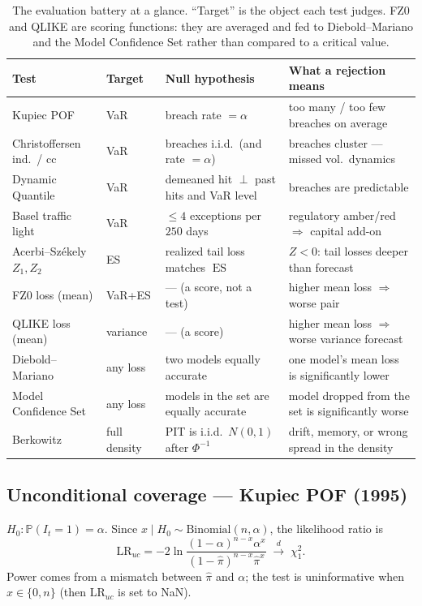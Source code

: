 \documentclass[11pt,a4paper]{article}
\newcommand{\Prob}{\mathbb{P}}
\newcommand{\ES}{\operatorname{ES}}
\newcommand{\dto}{\xrightarrow{d}}
\begin{document}
\begin{table}[h]
\centering\small
\begin{tabular}{@{}p{3.0cm}p{1.1cm}p{4.6cm}p{4.6cm}@{}}
\toprule
Test & Target & Null hypothesis & What a rejection means \\
\midrule
Kupiec POF        & VaR & breach rate $=\alpha$ & too many / too few breaches on average \\
Christoffersen ind.\ / cc & VaR & breaches i.i.d.\ (and rate $=\alpha$) & breaches cluster --- missed vol.\ dynamics \\
Dynamic Quantile  & VaR & demeaned hit $\perp$ past hits and VaR level & breaches are predictable \\
Basel traffic light & VaR & $\le4$ exceptions per $250$ days & regulatory amber/red $\Rightarrow$ capital add-on \\
Acerbi--Székely $Z_1,Z_2$ & ES & realized tail loss matches $\ES$ & $Z<0$: tail losses deeper than forecast \\
FZ0 loss (mean)   & VaR+ES & --- (a score, not a test) & higher mean loss $\Rightarrow$ worse pair \\
QLIKE loss (mean) & variance & --- (a score) & higher mean loss $\Rightarrow$ worse variance forecast \\
Diebold--Mariano  & any loss & two models equally accurate & one model's mean loss is significantly lower \\
Model Confidence Set & any loss & models in the set are equally accurate & model dropped from the set is significantly worse \\
Berkowitz         & full density & PIT is i.i.d.\ $N(0,1)$ after $\Phi^{-1}$ & drift, memory, or wrong spread in the density \\
\bottomrule
\end{tabular}
\caption{The evaluation battery at a glance. ``Target'' is the object each test
judges. FZ0 and QLIKE are scoring functions: they are averaged and fed to
Diebold--Mariano and the Model Confidence Set rather than compared to a critical
value.}\label{tab:tests}
\end{table}

\subsection{Unconditional coverage --- Kupiec POF (1995)}\label{sec:kupiec}

$H_0:\Prob(I_t=1)=\alpha$. Since $x\mid H_0\sim\text{Binomial}(n,\alpha)$, the
likelihood ratio is
\begin{equation}
  \mathrm{LR}_{uc}
  = -2\ln\frac{(1-\alpha)^{n-x}\alpha^{x}}
              {(1-\hat\pi)^{n-x}\hat\pi^{x}}
  \;\dto\; \chi^2_1 .
\end{equation}
Power comes from a mismatch between $\hat\pi$ and $\alpha$; the test is
uninformative when $x\in\{0,n\}$ (then $\mathrm{LR}_{uc}$ is set to NaN).
\end{document}
